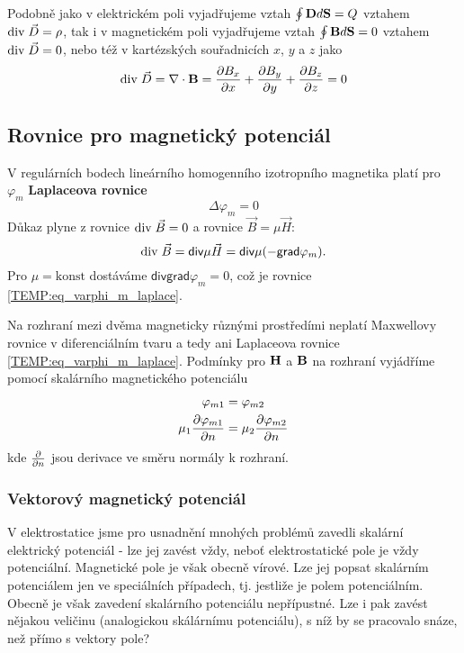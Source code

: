       Podobně jako v elektrickém poli vyjadřujeme vztah $\oint\mathbf{D}d\mathbf{S} = Q$ vztahem $\mathrm{div}\;\vec{D}
      = \rho$, tak i v magnetickém poli vyjadřujeme vztah $\oint\mathbf{B}d\mathbf{S} = 0$ vztahem
      $\mathrm{div}\;\vec{D} = 0$, nebo též v kartézských souřadnicích $x$, $y$ a $z$ jako $$\mathrm{div}\;\vec{D} =
      \nabla\cdot\mathbf{B} = \frac{\partial B_x}{\partial x} + \frac{\partial B_y}{\partial y} + \frac{\partial B_z}{\partial z} = 0$$
                     
    \subsection{Rovnice pro magnetický potenciál}
      V regulárních bodech lineárního homogenního izotropního magnetika platí pro $\varphi_m$
      \textbf{Laplaceova rovnice}
      \begin{equation}\label{TEMP:eq_varphi_m_laplace}
        \Delta\varphi_m = 0
      \end{equation}      
    Důkaz plyne z rovnice $\mathrm{div}\;\vec{B} = 0$ a rovnice $\vec{B} = \mu\vec{H}$: $$\mathrm{div}\;\vec{B} =
    \textsf{div}\mu\vec{H} = \textsf{div}\mu(-\textsf{grad}\varphi_m).$$ Pro $\mu = \text{konst}$
    dostáváme $\textsf{div}\textsf{grad}\varphi_m = 0$, což je rovnice
    \ref{TEMP:eq_varphi_m_laplace}.
    
    Na rozhraní mezi dvěma magneticky různými prostředími neplatí Maxwellovy rovnice v
    diferenciálním tvaru a tedy ani Laplaceova rovnice \ref{TEMP:eq_varphi_m_laplace}. Podmínky pro
    $\mathbf{H}$ a $\mathbf{B}$ na rozhraní vyjádříme pomocí skalárního magnetického potenciálu
     \begin{align}\label{TEMP:eq_mag_U_rozhrani}
       \varphi_{m1}                 &= \varphi_{m2} \\
       \mu_1\frac{\partial \varphi_{m1}}{\partial n}  &= \mu_2\frac{\partial \varphi_{m2}}{\partial n} 
     \end{align}
    kde $\frac{\partial }{\partial n}$ jsou derivace ve směru normály k rozhraní. 
    
    \subsubsection{Vektorový magnetický potenciál}
      V elektrostatice jsme pro usnadnění mnohých problémů zavedli skalární elektrický potenciál -
      lze jej zavést vždy, neboť elektrostatické pole je vždy potenciální. Magnetické pole je však
      obecně vírové. Lze jej popsat skalárním potenciálem jen ve speciálních případech, tj.
      jestliže je polem potenciálním. Obecně je však zavedení skalárního potenciálu nepřípustné.
      Lze i pak zavést nějakou veličinu (analogickou skálárnímu potenciálu), s níž by se pracovalo
      snáze, než přímo s vektory pole?
      
